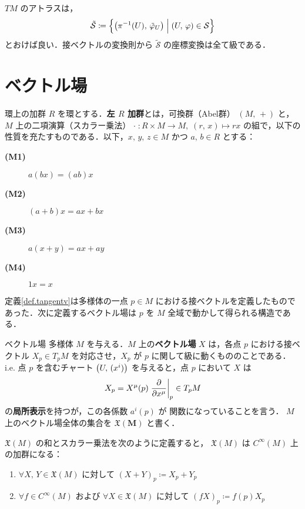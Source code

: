 \documentclass[geometry_main]{subfiles}
\begin{document}
$TM$ のアトラスは，
\begin{align} 
	\tilde{\mathcal{S}} \coloneqq \Bigl\{ \bigl( \pi^{-1}(U),\, \tilde{\varphi}_U \bigr)  \Bigm| (U,\, \varphi) \in \mathcal{S} \Bigr\} 
\end{align}
とおけば良い．接ベクトルの変換則から $\tilde{\mathcal{S}}$ の座標変換は全て\cinfty 級である．


\section{ベクトル場}

\begin{myaxiom}[label=ax.module]{環上の加群}
	$R$ を環とする．\textbf{左 $R$ 加群}とは，可換群（Abel群） $(M,\, +)$ と，$M$ 上の二項演算（スカラー乗法） $\cdot\; \colon R \times M \to M,\; (r, \, x) \mapsto rx$ の組で，以下の性質を充たすものである．以下，$x,\, y,\, z \in M$ かつ $a,\, b \in R$ とする：
	\begin{description}
		\item[\textbf{(M1)}] $a(b x) = (ab) x$
		\item[\textbf{(M2)}] $(a+b)x = ax + bx$
		\item[\textbf{(M3)}] $a(x + y) = ax + ay$
		\item[\textbf{(M4)}] $1 x = x$ 
	\end{description}
\end{myaxiom}

定義\ref{def.tangentv}は\cinfty 多様体の一点 $p \in M$ における接ベクトルを定義したものであった．次に定義するベクトル場は $p$ を $M$ 全域で動かして得られる構造である．

\begin{mydef}[label=vectorfield]{ベクトル場}
	\cinfty 多様体 $M$ を与える．$M$ 上の\cinfty \textbf{ベクトル場} $X$ は，各点 $p$ における接ベクトル $X_p \in T_pM$ を対応させ，$X_p$ が $p$ に関して\cinfty 級に動くもののことである．i.e. 点 $p$ を含むチャート $\bigl(U,\, (x^i)\bigr)$ を与えると，点 $p$ において $X$ は
	\begin{align}
		\label{eq.local}
		X_p = X^\mu(p) \eval{\pdv{}{x^\mu}}_p \in T_pM
	\end{align}
	の\textbf{局所表示}を持つが，この各係数 $a^i(p)$ が \cinfty 関数になっていることを言う．
	\tcblower	
	$M$ 上のベクトル場全体の集合を $\bm{\mathfrak{X}(M)}$ と書く．
\end{mydef}

\begin{mydef}[label=def.totvecf]{}
	$\mathfrak{X}(M)$ の和とスカラー乗法を次のように定義すると， $\mathfrak{X}(M)$ は $C^\infty(M)$ 上の加群になる：
	\begin{enumerate}
		\item $\forall X,\, Y \in \mathfrak{X}(M)$ に対して $(X+Y)_p \coloneqq X_p + Y_p$
		\item $\forall f \in C^\infty (M)$ および $\forall X \in \mathfrak{X}(M)$ に対して $(fX)_p \coloneqq f(p) X_p$
	\end{enumerate}
\end{mydef}
\end{document}
